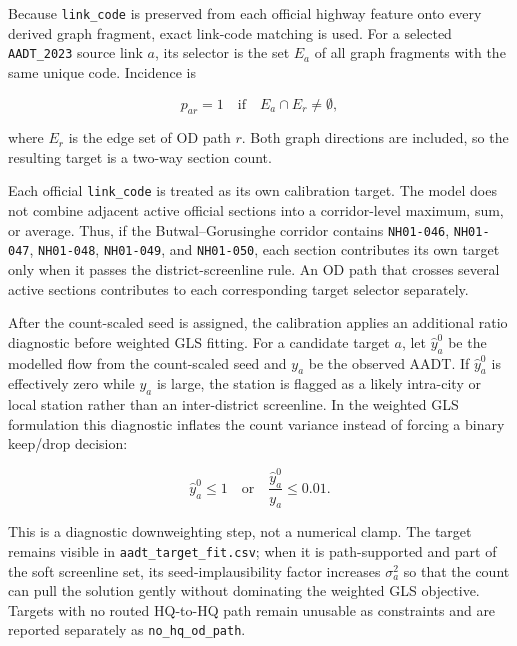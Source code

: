 \documentclass[11pt,a4paper]{article}
\begin{document}
Because \texttt{link\_code} is preserved from each official highway feature
onto every derived graph fragment, exact link-code matching is used. For a
selected \texttt{AADT\_2023} source link $a$, its selector is the set $E_a$ of
all graph fragments with the same unique code.
Incidence is

\begin{equation}
p_{ar}=1 \quad \text{if} \quad E_a\cap E_r\neq\emptyset ,
\end{equation}

where $E_r$ is the edge set of OD path $r$. Both graph directions are included,
so the resulting target is a two-way section count.

Each official \texttt{link\_code} is treated as its own calibration target. The
model does not combine adjacent active official sections into a corridor-level
maximum, sum, or average. Thus, if the Butwal--Gorusinghe corridor contains
\texttt{NH01-046}, \texttt{NH01-047}, \texttt{NH01-048}, \texttt{NH01-049}, and
\texttt{NH01-050}, each section contributes its own target only when it passes
the district-screenline rule. An OD path that crosses several active sections
contributes to each corresponding target selector separately.

After the count-scaled seed is assigned, the calibration applies an additional
ratio diagnostic before weighted GLS fitting. For a candidate target $a$, let
$\hat{y}^0_a$ be the modelled flow from the count-scaled seed and $y_a$ be the
observed AADT. If $\hat{y}^0_a$ is effectively zero while $y_a$ is large, the
station is flagged as a likely intra-city or local station rather than an
inter-district screenline. In the weighted GLS formulation this diagnostic
inflates the count variance instead of forcing a binary keep/drop decision:

\begin{equation}
\hat{y}^0_a \leq 1
\quad\text{or}\quad
\frac{\hat{y}^0_a}{y_a} \leq 0.01 .
\end{equation}

This is a diagnostic downweighting step, not a numerical clamp. The target
remains visible in \texttt{aadt\_target\_fit.csv}; when it is path-supported and
part of the soft screenline set, its seed-implausibility factor increases
$\sigma_a^2$ so that the count can pull the solution gently without dominating
the weighted GLS objective. Targets with no routed HQ-to-HQ path remain
unusable as constraints and are reported separately as \texttt{no\_hq\_od\_path}.
\end{document}
